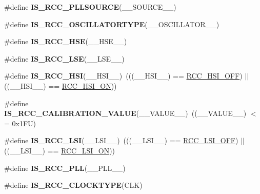 \begin{DoxyCompactItemize}
\item 
\#define {\bfseries I\+S\+\_\+\+R\+C\+C\+\_\+\+P\+L\+L\+S\+O\+U\+R\+CE}(\+\_\+\+\_\+\+S\+O\+U\+R\+C\+E\+\_\+\+\_\+)
\item 
\#define {\bfseries I\+S\+\_\+\+R\+C\+C\+\_\+\+O\+S\+C\+I\+L\+L\+A\+T\+O\+R\+T\+Y\+PE}(\+\_\+\+\_\+\+O\+S\+C\+I\+L\+L\+A\+T\+O\+R\+\_\+\+\_\+)
\item 
\#define {\bfseries I\+S\+\_\+\+R\+C\+C\+\_\+\+H\+SE}(\+\_\+\+\_\+\+H\+S\+E\+\_\+\+\_\+)
\item 
\#define {\bfseries I\+S\+\_\+\+R\+C\+C\+\_\+\+L\+SE}(\+\_\+\+\_\+\+L\+S\+E\+\_\+\+\_\+)
\item 
\mbox{\label{group___r_c_c___private___macros_ga230f351a740560f6b51cdc4b7051606e}} 
\#define {\bfseries I\+S\+\_\+\+R\+C\+C\+\_\+\+H\+SI}(\+\_\+\+\_\+\+H\+S\+I\+\_\+\+\_\+)~(((\+\_\+\+\_\+\+H\+S\+I\+\_\+\+\_\+) == \hyperlink{group___r_c_c___h_s_i___config_ga1b34d37d3b51afec0758b3ddc7a7e665}{R\+C\+C\+\_\+\+H\+S\+I\+\_\+\+O\+FF}) $\vert$$\vert$ ((\+\_\+\+\_\+\+H\+S\+I\+\_\+\+\_\+) == \hyperlink{group___r_c_c___h_s_i___config_ga0bf09ef9e46d5da25cced7b3122f92f5}{R\+C\+C\+\_\+\+H\+S\+I\+\_\+\+ON}))
\item 
\mbox{\label{group___r_c_c___private___macros_ga0811e1266f1690c9f967df0129cb9d66}} 
\#define {\bfseries I\+S\+\_\+\+R\+C\+C\+\_\+\+C\+A\+L\+I\+B\+R\+A\+T\+I\+O\+N\+\_\+\+V\+A\+L\+UE}(\+\_\+\+\_\+\+V\+A\+L\+U\+E\+\_\+\+\_\+)~((\+\_\+\+\_\+\+V\+A\+L\+U\+E\+\_\+\+\_\+) $<$= 0x1\+F\+U)
\item 
\mbox{\label{group___r_c_c___private___macros_ga2961f77a4ee7870f36d9f7f6729a0608}} 
\#define {\bfseries I\+S\+\_\+\+R\+C\+C\+\_\+\+L\+SI}(\+\_\+\+\_\+\+L\+S\+I\+\_\+\+\_\+)~(((\+\_\+\+\_\+\+L\+S\+I\+\_\+\+\_\+) == \hyperlink{group___r_c_c___l_s_i___config_gaa1710927d79a2032f87f039c4a27356a}{R\+C\+C\+\_\+\+L\+S\+I\+\_\+\+O\+FF}) $\vert$$\vert$ ((\+\_\+\+\_\+\+L\+S\+I\+\_\+\+\_\+) == \hyperlink{group___r_c_c___l_s_i___config_ga6b364ac3500e60b6bff695ee518c87d6}{R\+C\+C\+\_\+\+L\+S\+I\+\_\+\+ON}))
\item 
\#define {\bfseries I\+S\+\_\+\+R\+C\+C\+\_\+\+P\+LL}(\+\_\+\+\_\+\+P\+L\+L\+\_\+\+\_\+)
\item 
\#define {\bfseries I\+S\+\_\+\+R\+C\+C\+\_\+\+C\+L\+O\+C\+K\+T\+Y\+PE}(C\+LK)

\end{DoxyCompactItemize}
